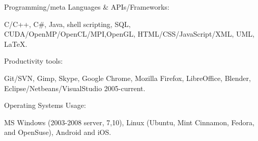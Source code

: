 \begin{cventries}

  \cventry
    {Programming/meta Languages \& APIs/Frameworks:} %
    {} %
    {} %
    {} %
    { 
      \begin{cvitems} %
        \item {C/C++, C\#, Java, shell scripting, SQL, CUDA/OpenMP/OpenCL/MPI,OpenGL, HTML/CSS/JavaScript/XML, UML, LaTeX.}
	  \end{cvitems}
    }  
  \vspace{-0.4cm}

  \cventry
    {Productivity tools:} %
    {} %
    {} %
    {} %
    {
      \begin{cvitems} %
        \item {Git/SVN, Gimp, Skype, Google Chrome, Mozilla Firefox, LibreOffice, Blender, Eclipse/Netbeans/VisualStudio 2005-current.}%
      \end{cvitems}
    }  
  \vspace{-0.4cm}  
    
%    
%    
  \cventry
    {Operating Systems Usage:} %
    {} 
    {} 
    {} 
    {
      \begin{cvitems} %
        \item {MS Windows (2003-2008 server, 7,10), Linux (Ubuntu, Mint Cinnamon, Fedora, and OpenSuse), Android and iOS.}        
      \end{cvitems}
    }  
    

\end{cventries}
